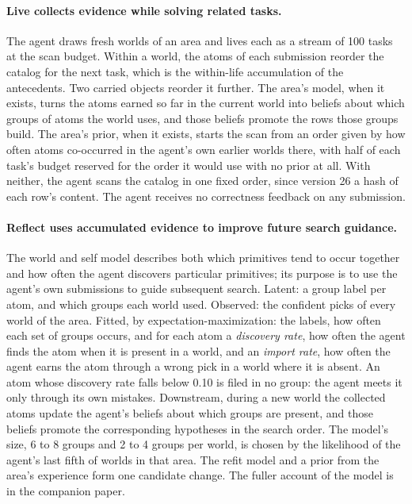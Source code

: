 \documentclass[11pt]{article}
\begin{document}
\paragraph{Live collects evidence while solving related tasks.} The agent draws fresh worlds of an area and lives each as a stream of 100 tasks at the scan budget. Within a world, the atoms of each submission reorder the catalog for the next task, which is the within-life accumulation of the antecedents. Two carried objects reorder it further. The area's model, when it exists, turns the atoms earned so far in the current world into beliefs about which groups of atoms the world uses, and those beliefs promote the rows those groups build. The area's prior, when it exists, starts the scan from an order given by how often atoms co-occurred in the agent's own earlier worlds there, with half of each task's budget reserved for the order it would use with no prior at all. With neither, the agent scans the catalog in one fixed order, since version 26 a hash of each row's content. The agent receives no correctness feedback on any submission.

\paragraph{Reflect uses accumulated evidence to improve future search guidance.} The world and self model describes both which primitives tend to occur together and how often the agent discovers particular primitives; its purpose is to use the agent's own submissions to guide subsequent search. Latent: a group label per atom, and which groups each world used. Observed: the confident picks of every world of the area. Fitted, by expectation-maximization: the labels, how often each set of groups occurs, and for each atom a \emph{discovery rate}, how often the agent finds the atom when it is present in a world, and an \emph{import rate}, how often the agent earns the atom through a wrong pick in a world where it is absent. An atom whose discovery rate falls below 0.10 is filed in no group: the agent meets it only through its own mistakes. Downstream, during a new world the collected atoms update the agent's beliefs about which groups are present, and those beliefs promote the corresponding hypotheses in the search order. The model's size, 6 to 8 groups and 2 to 4 groups per world, is chosen by the likelihood of the agent's last fifth of worlds in that area. The refit model and a prior from the area's experience form one candidate change. The fuller account of the model is in the companion paper.
\end{document}
